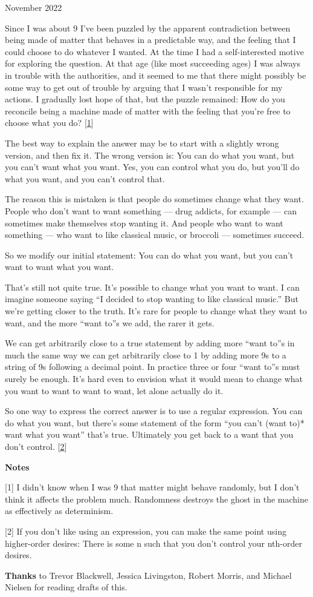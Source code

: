 November 2022

Since I was about 9 I've been puzzled by the apparent contradiction
between being made of matter that behaves in a predictable way, and the
feeling that I could choose to do whatever I wanted. At the time I had a
self-interested motive for exploring the question. At that age (like
most succeeding ages) I was always in trouble with the authorities, and
it seemed to me that there might possibly be some way to get out of
trouble by arguing that I wasn't responsible for my actions. I gradually
lost hope of that, but the puzzle remained: How do you reconcile being a
machine made of matter with the feeling that you're free to choose what
you do? {[}\hyperref[f1n]{1}{]}

The best way to explain the answer may be to start with a slightly wrong
version, and then fix it. The wrong version is: You can do what you
want, but you can't want what you want. Yes, you can control what you
do, but you'll do what you want, and you can't control that.

The reason this is mistaken is that people do sometimes change what they
want. People who don't want to want something --- drug addicts, for
example --- can sometimes make themselves stop wanting it. And people
who want to want something --- who want to like classical music, or
broccoli --- sometimes succeed.

So we modify our initial statement: You can do what you want, but you
can't want to want what you want.

That's still not quite true. It's possible to change what you want to
want. I can imagine someone saying ``I decided to stop wanting to like
classical music.'' But we're getting closer to the truth. It's rare for
people to change what they want to want, and the more ``want to''s we
add, the rarer it gets.

We can get arbitrarily close to a true statement by adding more ``want
to''s in much the same way we can get arbitrarily close to 1 by adding
more 9s to a string of 9s following a decimal point. In practice three
or four ``want to''s must surely be enough. It's hard even to envision
what it would mean to change what you want to want to want to want, let
alone actually do it.

So one way to express the correct answer is to use a regular expression.
You can do what you want, but there's some statement of the form ``you
can't (want to)* want what you want'' that's true. Ultimately you get
back to a want that you don't control. {[}\hyperref[f2n]{2}{]}

\textbf{Notes}

{[}1{]} I didn't know when I was 9 that matter might behave randomly,
but I don't think it affects the problem much. Randomness destroys the
ghost in the machine as effectively as determinism.

{[}2{]} If you don't like using an expression, you can make the same
point using higher-order desires: There is some n such that you don't
control your nth-order desires.

\textbf{Thanks} to Trevor Blackwell, Jessica Livingston, Robert Morris,
and Michael Nielsen for reading drafts of this.
